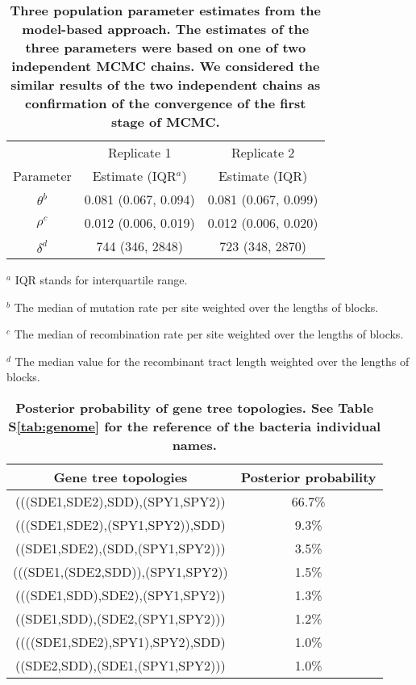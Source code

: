 \documentclass[10pt]{article}
\providecommand{\tabularnewline}{\\}
\begin{document}
\begin{table}[!ht]
\caption{
\bf{Three population parameter estimates from the model-based approach.}
The estimates of the three parameters were based on one of two independent
MCMC chains.  We considered the similar 
results of the two independent chains as confirmation of 
the convergence of the first stage of MCMC.}
\noindent \begin{centering}
\begin{tabular}{ccc}
\hline
& Replicate 1 & Replicate 2\tabularnewline
Parameter & Estimate (IQR$^a$) & Estimate (IQR)\tabularnewline
\hline
$\theta^b$ & 0.081 (0.067, 0.094) & 0.081 (0.067, 0.099)\tabularnewline
$\rho^c$ & 0.012 (0.006, 0.019) & 0.012 (0.006, 0.020)\tabularnewline
$\delta^d$ & 744 (346, 2848) & 723 (348, 2870)\tabularnewline
\hline
\end{tabular}
\par\end{centering}
\begin{flushleft}
$^a$ IQR stands for interquartile range.

$^b$ The median of mutation rate per site weighted over the lengths of blocks. 

$^c$ The median of recombination rate per site weighted over the lengths of blocks.

$^d$ The median value for the recombinant tract length weighted over the lengths of blocks.
\end{flushleft}
\label{tab:three}
\end{table}

\begin{table}
\caption{
\bf{Posterior probability of gene tree topologies.}
See Table S\ref{tab:genome} for the reference of the bacteria
individual names.}
\noindent \begin{centering}
\begin{tabular}{cc}
\hline 
Gene tree topologies & Posterior probability\tabularnewline
\hline
(((SDE1,SDE2),SDD),(SPY1,SPY2)) & 66.7\%\tabularnewline
(((SDE1,SDE2),(SPY1,SPY2)),SDD) & 9.3\%\tabularnewline
((SDE1,SDE2),(SDD,(SPY1,SPY2))) & 3.5\%\tabularnewline
(((SDE1,(SDE2,SDD)),(SPY1,SPY2)) & 1.5\%\tabularnewline
(((SDE1,SDD),SDE2),(SPY1,SPY2)) & 1.3\%\tabularnewline
((SDE1,SDD),(SDE2,(SPY1,SPY2))) & 1.2\%\tabularnewline
((((SDE1,SDE2),SPY1),SPY2),SDD) & 1.0\%\tabularnewline
((SDE2,SDD),(SDE1,(SPY1,SPY2))) & 1.0\%\tabularnewline
\hline
\end{tabular}
\par\end{centering}
\label{tab:Gene-tree-topologies}
\end{table}
\clearpage{}
\end{document}
